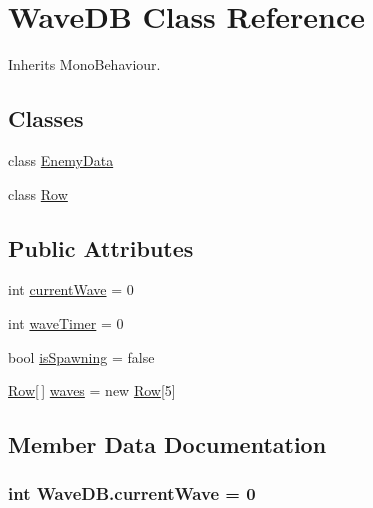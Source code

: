\hypertarget{class_wave_d_b}{}\section{Wave\+DB Class Reference}
\label{class_wave_d_b}


Inherits Mono\+Behaviour.

\subsection*{Classes}
\begin{DoxyCompactItemize}
\item 
class \hyperlink{class_wave_d_b_1_1_enemy_data}{Enemy\+Data}
\item 
class \hyperlink{class_wave_d_b_1_1_row}{Row}
\end{DoxyCompactItemize}
\subsection*{Public Attributes}
\begin{DoxyCompactItemize}
\item 
int \hyperlink{class_wave_d_b_a633523632bf5100139b983f1fb8dd302}{current\+Wave} = 0
\item 
int \hyperlink{class_wave_d_b_a76a00f39c5954e0c5e39ec3bd31011dd}{wave\+Timer} = 0
\item 
bool \hyperlink{class_wave_d_b_a58a898598de7b6fe4f7209d76c172ef4}{is\+Spawning} = false
\item 
\hyperlink{class_wave_d_b_1_1_row}{Row}\mbox{[}$\,$\mbox{]} \hyperlink{class_wave_d_b_a9f4006a3f6ec66dfcc10a8fc0e01f702}{waves} = new \hyperlink{class_wave_d_b_1_1_row}{Row}\mbox{[}5\mbox{]}
\end{DoxyCompactItemize}


\subsection{Member Data Documentation}
\subsubsection[{\texorpdfstring{current\+Wave}{currentWave}}]{\setlength{\rightskip}{0pt plus 5cm}int Wave\+D\+B.\+current\+Wave = 0}\hypertarget{class_wave_d_b_a633523632bf5100139b983f1fb8dd302}{}\label{class_wave_d_b_a633523632bf5100139b983f1fb8dd302}
